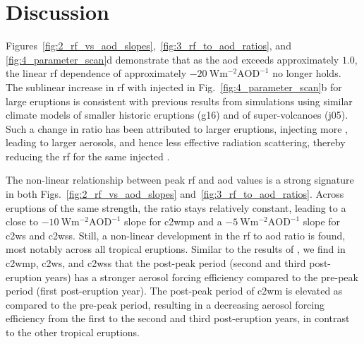 \documentclass{ametsocV6.1}
\newcommand{\iso}[1][i]{{#1}njected \ce{SO2}}
\begin{document}
\section{Discussion}\label{sec:discussion}


Figures~\ref{fig:2_rf_vs_aod_slopes},~\ref{fig:3_rf_to_aod_ratios}, and
\ref{fig:4_parameter_scan}d demonstrate that as the \gls{aod} exceeds approximately
\(1.0\), the linear \gls{rf} dependence of approximately
\(\SI{-20}{\watt\metre^{-2}\mathrm{AOD}^{-1}}\) no longer holds. The sublinear increase
in \gls{rf} with \iso{} in Fig.~\ref{fig:4_parameter_scan}b for large eruptions is
consistent with previous results from simulations using similar climate models of
smaller historic eruptions (\gls{g16}) and of super-volcanoes (\gls{j05}). Such a change
in ratio has been attributed to larger eruptions, injecting more , leading to
larger aerosols, and hence less effective radiation scattering, thereby reducing the
\gls{rf} for the same \iso{} \citep{english2013, timmreck2010, timmreck2018}.

The non-linear relationship between peak \gls{rf} and \gls{aod} values is a strong
signature in both Figs.~\ref{fig:2_rf_vs_aod_slopes} and~\ref{fig:3_rf_to_aod_ratios}.
Across eruptions of the same strength, the ratio stays relatively constant, leading to a
close to \(\SI{-10}{\watt\metre^{-2}\mathrm{AOD}^{-1}}\) slope for \gls{c2wmp} and a
\(\SI{-5}{\watt\metre^{-2}\mathrm{AOD}^{-1}}\) slope for \gls{c2ws} and \gls{c2wss}.
Still, a non-linear development in the \gls{rf} to \gls{aod} ratio is found, most
notably across all tropical eruptions. Similar to the results of \citet{marshall2020},
we find in \gls{c2wmp}, \gls{c2ws}, and \gls{c2wss} that the post-peak period (second
and third post-eruption years) has a stronger aerosol forcing efficiency compared to the
pre-peak period (first post-eruption year). The post-peak period of \gls{c2wm} is
elevated as compared to the pre-peak period, resulting in a decreasing aerosol forcing
efficiency from the first to the second and third post-eruption years, in contrast to
the other tropical eruptions.
\end{document}
